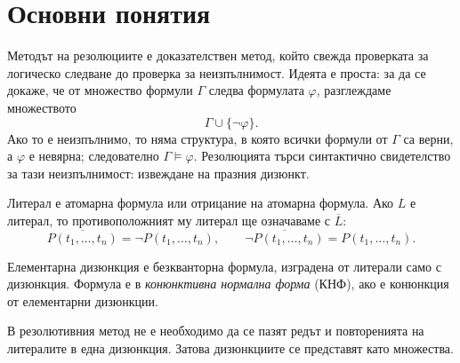 \begin{konspekt}
\end{konspekt}

\section{Основни понятия}\label{s:22.1}

Методът на резолюциите е доказателствен метод, който свежда проверката за логическо следване до проверка за неизпълнимост. Идеята е проста: за да се докаже, че от множество формули $\Gamma$ следва формулата $\varphi$, разглеждаме множеството
\[
\Gamma\cup\{\neg\varphi\}.
\]
Ако то е неизпълнимо, то няма структура, в която всички формули от $\Gamma$ са верни, а $\varphi$ е невярна; следователно $\Gamma\models\varphi$. Резолюцията търси синтактично свидетелство за тази неизпълнимост: извеждане на празния дизюнкт.

\begin{defn}
Литерал е атомарна формула или отрицание на атомарна формула. Ако $L$ е литерал, то противоположният му литерал ще означаваме с $\overline L$:
\[
\overline{P(t_1,\ldots,t_n)}=\neg P(t_1,\ldots,t_n),
\qquad
\overline{\neg P(t_1,\ldots,t_n)}=P(t_1,\ldots,t_n).
\]
\end{defn}

\begin{defn}
Елементарна дизюнкция е безкванторна формула, изградена от литерали само с дизюнкция. Формула е в \emph{конюнктивна нормална форма} (КНФ), ако е конюнкция от елементарни дизюнкции.
\end{defn}

В резолютивния метод не е необходимо да се пазят редът и повторенията на литералите в една дизюнкция. Затова дизюнкциите се представят като множества.

